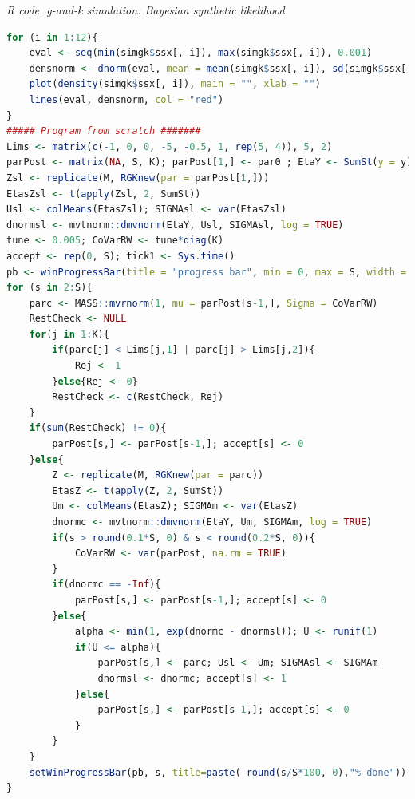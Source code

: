 \begin{tcolorbox}[enhanced,width=4.67in,center upper,
	fontupper=\large\bfseries,drop shadow southwest,sharp corners]
	\textit{R code. g-and-k simulation: Bayesian synthetic likelihood}
	\begin{VF}
		\begin{lstlisting}[language=R]
for (i in 1:12){
	eval <- seq(min(simgk$ssx[, i]), max(simgk$ssx[, i]), 0.001)
	densnorm <- dnorm(eval, mean = mean(simgk$ssx[, i]), sd(simgk$ssx[, i])) 
	plot(density(simgk$ssx[, i]), main = "", xlab = "")
	lines(eval, densnorm, col = "red")
}
##### Program from scratch #######
Lims <- matrix(c(-1, 0, 0, -5, -0.5, 1, rep(5, 4)), 5, 2)
parPost <- matrix(NA, S, K); parPost[1,] <- par0 ; EtaY <- SumSt(y = y)
Zsl <- replicate(M, RGKnew(par = parPost[1,]))
EtasZsl <- t(apply(Zsl, 2, SumSt))
Usl <- colMeans(EtasZsl); SIGMAsl <- var(EtasZsl)
dnormsl <- mvtnorm::dmvnorm(EtaY, Usl, SIGMAsl, log = TRUE)
tune <- 0.005; CoVarRW <- tune*diag(K)
accept <- rep(0, S); tick1 <- Sys.time()
pb <- winProgressBar(title = "progress bar", min = 0, max = S, width = 300)
for (s in 2:S){
	parc <- MASS::mvrnorm(1, mu = parPost[s-1,], Sigma = CoVarRW)
	RestCheck <- NULL
	for(j in 1:K){
		if(parc[j] < Lims[j,1] | parc[j] > Lims[j,2]){
			Rej <- 1
		}else{Rej <- 0}
		RestCheck <- c(RestCheck, Rej)
	}
	if(sum(RestCheck) != 0){
		parPost[s,] <- parPost[s-1,]; accept[s] <- 0
	}else{
		Z <- replicate(M, RGKnew(par = parc))
		EtasZ <- t(apply(Z, 2, SumSt))
		Um <- colMeans(EtasZ); SIGMAm <- var(EtasZ)
		dnormc <- mvtnorm::dmvnorm(EtaY, Um, SIGMAm, log = TRUE)
		if(s > round(0.1*S, 0) & s < round(0.2*S, 0)){
			CoVarRW <- var(parPost, na.rm = TRUE)
		}
		if(dnormc == -Inf){
			parPost[s,] <- parPost[s-1,]; accept[s] <- 0
		}else{
			alpha <- min(1, exp(dnormc - dnormsl)); U <- runif(1)
			if(U <= alpha){
				parPost[s,] <- parc; Usl <- Um; SIGMAsl <- SIGMAm
				dnormsl <- dnormc; accept[s] <- 1
			}else{
				parPost[s,] <- parPost[s-1,]; accept[s] <- 0
			}
		}
	}
	setWinProgressBar(pb, s, title=paste( round(s/S*100, 0),"% done"))
}
\end{lstlisting}
	\end{VF}
\end{tcolorbox}

